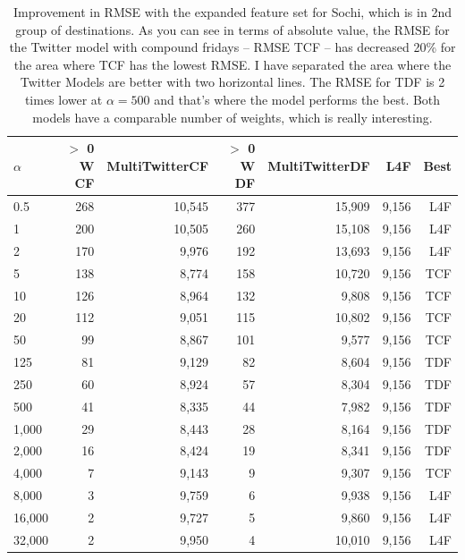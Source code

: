 \documentclass[minf,twoside,singlespacing,parskip,frontabs,notimes,11pt]{infthesis}
\begin{document}
\begin{table}[]
\begin{center}
\begin{tabular}{ l | r | r | r | r | r | r}
$\alpha$ & $>$ 0 W CF & MultiTwitterCF & $>$ 0 W DF & MultiTwitterDF & L4F & Best\\
\hline
0.5 & 268 & 10,545 & 377 & 15,909 & 9,156 & L4F\\
1 & 200 & 10,505 & 260 & 15,108 & 9,156 & L4F\\
2 & 170 & 9,976 & 192 & 13,693 & 9,156 & L4F\\
\hline
5 & 138 & 8,774 & 158 & 10,720 & 9,156 & TCF\\
10 & 126 & 8,964 & 132 & 9,808 & 9,156 & TCF\\
20 & 112 & 9,051 & 115 & 10,802 & 9,156 & TCF\\
50 & 99 & 8,867 & 101 & 9,577 & 9,156 & TCF\\
125 & 81 & 9,129 & 82 & 8,604 & 9,156 & TDF\\
250 & 60 & 8,924 & 57 & 8,304 & 9,156 & TDF\\
500 & 41 & 8,335 & 44 & 7,982 & 9,156 & TDF\\
1,000 & 29 & 8,443 & 28 & 8,164 & 9,156 & TDF\\
2,000 & 16 & 8,424 & 19 & 8,341 & 9,156 & TDF\\
4,000 & 7 & 9,143 & 9 & 9,307 & 9,156 & TCF\\
\hline
8,000 & 3 & 9,759 & 6 & 9,938 & 9,156 & L4F\\
16,000 & 2 & 9,727 & 5 & 9,860 & 9,156 & L4F\\
32,000 & 2 & 9,950 & 4 & 10,010 & 9,156 & L4F\\
\end{tabular}
\end{center}
\caption{Improvement in RMSE with the expanded feature set for Sochi, which is in 2nd group of destinations.  
As you can see in terms of absolute value, the RMSE for the Twitter model with compound fridays -- RMSE TCF -- has decreased 20\% for the area where TCF has the lowest RMSE. I have separated the area where the Twitter Models are better with two horizontal lines. The RMSE for TDF is 2 times lower at $\alpha=500$ and that's where the model performs the best. Both models have a comparable number of weights, which is really interesting.}
\label{table-sochi}
\end{table}
\end{document}
